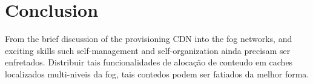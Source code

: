 \section{Conclusion}
\label{sec:Conclusion}


From the brief discussion of the provisioning CDN into the fog networks, and exciting skills such self-management and self-organization ainda precisam ser enfretados. Distribuir tais funcionalidades de alocação de conteudo em caches localizados multi-niveis da fog, tais contedos podem ser fatiados da melhor forma.
	